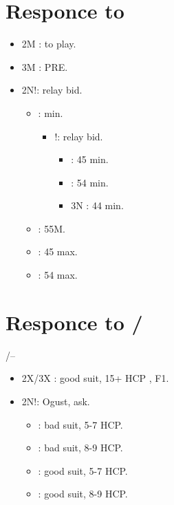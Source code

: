 \documentclass[12pt,twoside,a5paper]{report}%
\begin{document}
\chapter*{Responce to }
		\begin{itemize}
		\renewcommand{\labelitemi}{}	
		\item 2M : to play.
		\item 3M : PRE.
		\item 2N!: relay bid.
			\begin{itemize}
			\renewcommand{\labelitemi}{--}
			\item {} : min.
				\begin{itemize}
				\renewcommand{\labelitemi}{--}
					\item {}!: relay bid.
						\begin{itemize}
						\renewcommand{\labelitemi}{--}
						\item {} : 4\sp{}5\he{} min.
						\item {} : 5\sp{}4\he{} min.
						\item 3N : 4\sp{}4\he{} min.
						\end{itemize}
				\end{itemize}
			\item {} : 55M.
			\item {} : 4\sp{}5\he{} max.
			\item {} : 5\sp{}4\he{} max.
			\end{itemize}
		\end{itemize}

\chapter*{Responce to /\sp{}}
	/-- \\
		\begin{itemize}
		\renewcommand{\labelitemi}{}	
		\item 2X/3X : good suit, 15+ HCP , F1.
		\item 2N!: Ogust, ask.
			\begin{itemize}
			\renewcommand{\labelitemi}{--}
				\item {} : bad suit, 5-7 HCP.
				\item {} : bad suit, 8-9 HCP.
				\item {} : good suit, 5-7 HCP.
				\item {} : good suit, 8-9 HCP.
			\end{itemize}
		\end{itemize}
\end{document}
